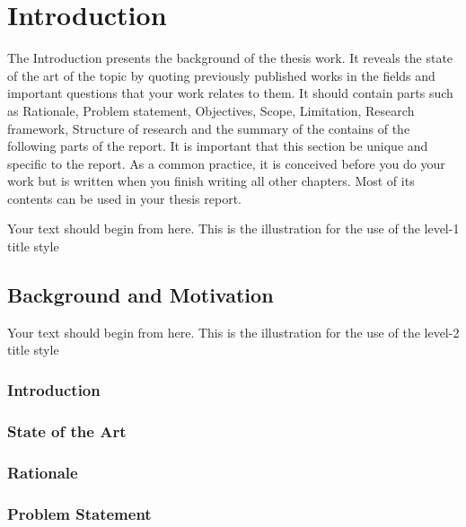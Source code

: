 
\chapter{Introduction}
\vspace{-1cm}
\doublespacing
\justifying

The Introduction presents the background of the thesis work. It reveals the state of the art of the topic by quoting previously published 
works in the fields and important questions that your work relates to them. It should contain parts such as Rationale, Problem statement, 
Objectives, Scope, Limitation, Research framework, Structure of research and the summary of the contains of the following parts of the report. 
It is important that this section be unique and specific to the report. As a common practice, it is conceived before you do your work but is 
written when you finish writing all other chapters. Most of its contents can be used in your thesis report.

Your text should begin from here. This is the illustration for the use of the level-1 title style

\section{Background and Motivation}

Your text should begin from here. This is the illustration for the use of the level-2 title style

\subsection{Introduction}

\subsection{State of the Art}


\subsection{Rationale}


\subsection{Problem Statement}

